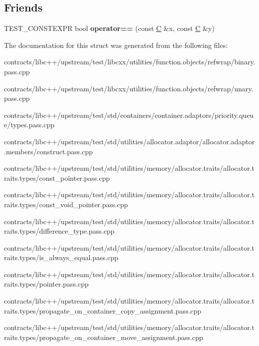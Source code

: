 \subsection*{Friends}
\begin{DoxyCompactItemize}
\item 
\mbox{\label{struct_c_af9bee3d848e5151d0aff05ea93ebba22}} 
T\+E\+S\+T\+\_\+\+C\+O\+N\+S\+T\+E\+X\+PR bool {\bfseries operator==} (const \mbox{\hyperlink{struct_c}{C}} \&x, const \mbox{\hyperlink{struct_c}{C}} \&y)
\end{DoxyCompactItemize}


The documentation for this struct was generated from the following files\+:\begin{DoxyCompactItemize}
\item 
contracts/libc++/upstream/test/libcxx/utilities/function.\+objects/refwrap/binary.\+pass.\+cpp\item 
contracts/libc++/upstream/test/libcxx/utilities/function.\+objects/refwrap/unary.\+pass.\+cpp\item 
contracts/libc++/upstream/test/std/containers/container.\+adaptors/priority.\+queue/types.\+pass.\+cpp\item 
contracts/libc++/upstream/test/std/utilities/allocator.\+adaptor/allocator.\+adaptor.\+members/construct.\+pass.\+cpp\item 
contracts/libc++/upstream/test/std/utilities/memory/allocator.\+traits/allocator.\+traits.\+types/const\+\_\+pointer.\+pass.\+cpp\item 
contracts/libc++/upstream/test/std/utilities/memory/allocator.\+traits/allocator.\+traits.\+types/const\+\_\+void\+\_\+pointer.\+pass.\+cpp\item 
contracts/libc++/upstream/test/std/utilities/memory/allocator.\+traits/allocator.\+traits.\+types/difference\+\_\+type.\+pass.\+cpp\item 
contracts/libc++/upstream/test/std/utilities/memory/allocator.\+traits/allocator.\+traits.\+types/is\+\_\+always\+\_\+equal.\+pass.\+cpp\item 
contracts/libc++/upstream/test/std/utilities/memory/allocator.\+traits/allocator.\+traits.\+types/pointer.\+pass.\+cpp\item 
contracts/libc++/upstream/test/std/utilities/memory/allocator.\+traits/allocator.\+traits.\+types/propagate\+\_\+on\+\_\+container\+\_\+copy\+\_\+assignment.\+pass.\+cpp\item 
contracts/libc++/upstream/test/std/utilities/memory/allocator.\+traits/allocator.\+traits.\+types/propagate\+\_\+on\+\_\+container\+\_\+move\+\_\+assignment.\+pass.\+cpp\item 

\end{DoxyCompactItemize}
